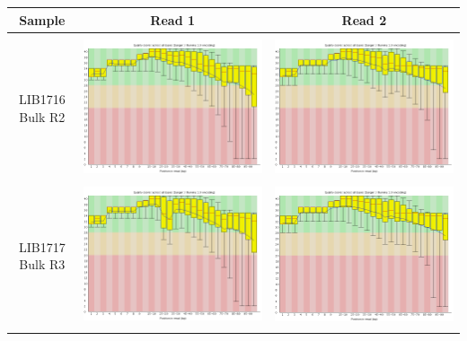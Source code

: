 \begin{center}
\begin{tabular}{ccc}
\toprule
Sample  & Read 1 & Read 2 \\  \midrule  \\
\begin{sideways}LIB1716 Bulk R2\end{sideways} & \includegraphics[width=0.4 \textwidth]{Appendices/images/Sample_LIB1716_base_quality_R1.png} & \includegraphics[width=0.4 \textwidth]{Appendices/images/Sample_LIB1716_base_quality_R2.png} \\ \midrule  \\
\begin{sideways}LIB1717 Bulk R3\end{sideways} & \includegraphics[width=0.4 \textwidth]{Appendices/images/Sample_LIB1717_base_quality_R1.png} & \includegraphics[width=0.4 \textwidth]{Appendices/images/Sample_LIB1717_base_quality_R2.png} \\ \midrule  \\

\end{tabular}
\end{center}
